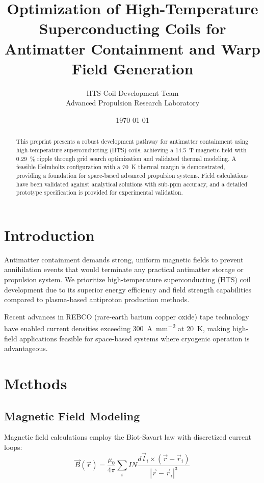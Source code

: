 \documentclass[12pt,a4paper]{article}
\title{Optimization of High-Temperature Superconducting Coils for Antimatter Containment and Warp Field Generation}
\author{
HTS Coil Development Team\\
Advanced Propulsion Research Laboratory
}
\date{\today}
\begin{document}
\maketitle

\begin{abstract}
This preprint presents a robust development pathway for antimatter containment using high-temperature superconducting (HTS) coils, achieving a \SI{14.5}{\tesla} magnetic field with \SI{0.29}{\percent} ripple through grid search optimization and validated thermal modeling. A feasible Helmholtz configuration with a \SI{70}{\kelvin} thermal margin is demonstrated, providing a foundation for space-based advanced propulsion systems. Field calculations have been validated against analytical solutions with sub-ppm accuracy, and a detailed prototype specification is provided for experimental validation.
\end{abstract}

\section{Introduction}

Antimatter containment demands strong, uniform magnetic fields to prevent annihilation events that would terminate any practical antimatter storage or propulsion system. We prioritize high-temperature superconducting (HTS) coil development due to its superior energy efficiency and field strength capabilities compared to plasma-based antiproton production methods.

Recent advances in REBCO (rare-earth barium copper oxide) tape technology have enabled current densities exceeding \SI{300}{\ampere\per\milli\meter\squared} at \SI{20}{\kelvin}, making high-field applications feasible for space-based systems where cryogenic operation is advantageous.

\section{Methods}

\subsection{Magnetic Field Modeling}

Magnetic field calculations employ the Biot-Savart law with discretized current loops:
\begin{equation}
\vec{B}(\vec{r}) = \frac{\mu_0}{4\pi} \sum_{i} I N \frac{d\vec{l}_i \times (\vec{r} - \vec{r}_i)}{|\vec{r} - \vec{r}_i|^3}
\end{equation}
\end{document}
